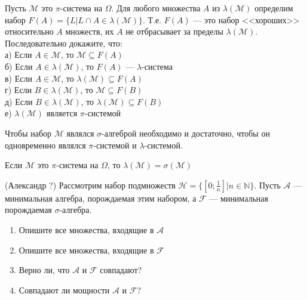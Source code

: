 \begin{solution}
\begin{problem}
Пусть $\mathcal{M}$ это $\pi$-система на $\Omega$. Для любого
множества $A$ из $\lambda(\mathcal{M})$ определим набор
$F(A)=\{L|L\cap A \in \lambda(\mathcal{M})\}$. Т.е. $F(A)$ --- это
набор <<хороших>> относительно $A$ множеств, их $A$ не отбрасывает
за пределы $\lambda(\mathcal{M})$. \\
Последовательно докажите, что: \\
а) Если $A \in \mathcal{M}$, то $\mathcal{M}\subseteq F(A)$ \\
б) Если $A\in\lambda(\mathcal{M})$, то $F(A)$ --- $\lambda$-система \\
в) Если $A \in \mathcal{M}$, то $\lambda(\mathcal{M})\subseteq
F(A)$ \\
г) Если $B\in \lambda(\mathcal{M})$, то $\mathcal{M}\subseteq
F(B)$ \\
д) Если $B\in \lambda(\mathcal{M})$, то
$\lambda(\mathcal{M})\subseteq
F(B)$ \\
е) $\lambda(\mathcal{M})$ является $\pi$-системой 
\end{problem} 
\begin{solution} 

\end{solution}

\begin{problem}
Чтобы набор $\mathcal{M}$ являлся $\sigma$-алгеброй необходимо и
достаточно, чтобы он одновременно являлся $\pi$-системой и
$\lambda$-системой. 
\end{problem} 
\begin{solution} 

\end{solution}

\begin{problem}
Если $\mathcal{M}$ это $\pi$-система на $\Omega$, то
$\lambda(\mathcal{M})=\sigma(\mathcal{M})$ 
\end{problem} 
\begin{solution} 

\end{solution}

\begin{problem}
(Александр ?) Рассмотрим набор подмножеств
$\mathcal{H}=\{[0;\frac{1}{n}]|n\in \mathbb{N}\}$. Пусть
$\mathcal{A}$ --- минимальная алгебра, порождаемая этим набором, а
$\mathcal{F}$ --- минимальная
порождаемая $\sigma$-алгебра. 
\begin{enumerate}
\item Опишите все множества, входящие в $\mathcal{A}$ 
\item  Опишите все множества, входящие в $\mathcal{F}$ 
\item  Верно ли, что $\mathcal{A}$ и $\mathcal{F}$ совпадают? 
\item Совпадают ли мощности $\mathcal{A}$ и $\mathcal{F}$?
\end{enumerate}


\end{problem}
\end{solution}
